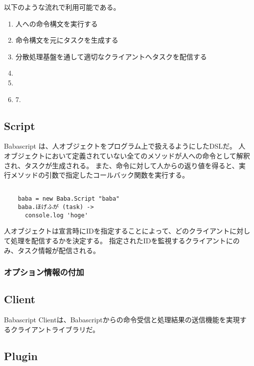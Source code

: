 以下のような流れで利用可能である。

\begin{enumerate}
\def\labelenumi{\arabic{enumi}.}
\item
  人への命令構文を実行する
\item
  命令構文を元にタスクを生成する
\item
  分散処理基盤を通して適切なクライアントへタスクを配信する
\item
\item
\item
  7.
\end{enumerate}

\subsection{Script}\label{script}

Babascript は、人オブジェクトをプログラム上で扱えるようにしたDSLだ。
人オブジェクトにおいて定義されていない全てのメソッドが人への命令として解釈され、タスクが生成される。
また、命令に対して人からの返り値を得ると、実行メソッドの引数で指定したコールバック関数を実行する。

\begin{verbatim}

    baba = new Baba.Script "baba"
    baba.ほげふが (task) ->
      console.log 'hoge'
\end{verbatim}

人オブジェクトは宣言時にIDを指定することによって、どのクライアントに対して処理を配信するかを決定する。
指定されたIDを監視するクライアントにのみ、タスク情報が配信される。

\subsubsection{オプション情報の付加}\label{ux30aaux30d7ux30b7ux30e7ux30f3ux60c5ux5831ux306eux4ed8ux52a0}

\subsection{Client}\label{client}

Babascript
Clientは、Babascriptからの命令受信と処理結果の送信機能を実現するクライアントライブラリだ。

\subsection{Plugin}\label{plugin}

